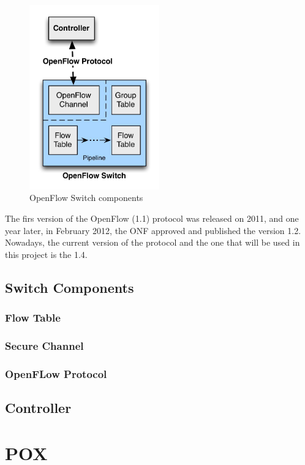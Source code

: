 \begin{figure}[htb]
\centering
\includegraphics[width=0.5\textwidth]{./images/OpenFlowSwitch.jpg}
\caption{OpenFlow Switch components} \label{fig:OpenFlowSwitch}
\end{figure}

\par 




\par 

The firs version of the OpenFlow (1.1) protocol was released on 2011, and one year later, in February 2012, the ONF approved and published the version 1.2. Nowadays, the current version of the protocol and the one that will be used in this project is the 1.4.

\subsection{Switch Components}
\label{subsec:PFSwitchComponents}

\subsubsection{Flow Table}
\label{subsec:SCFlowTable} 

\subsubsection{Secure Channel}
\label{subsec:SCSecureChannel}

\subsubsection{OpenFLow Protocol}
\label{subsec:OFProtocolSC}

\subsection{Controller}
\label{subsec:OFController}

\section{POX}
\label{sec:BGPOX}
